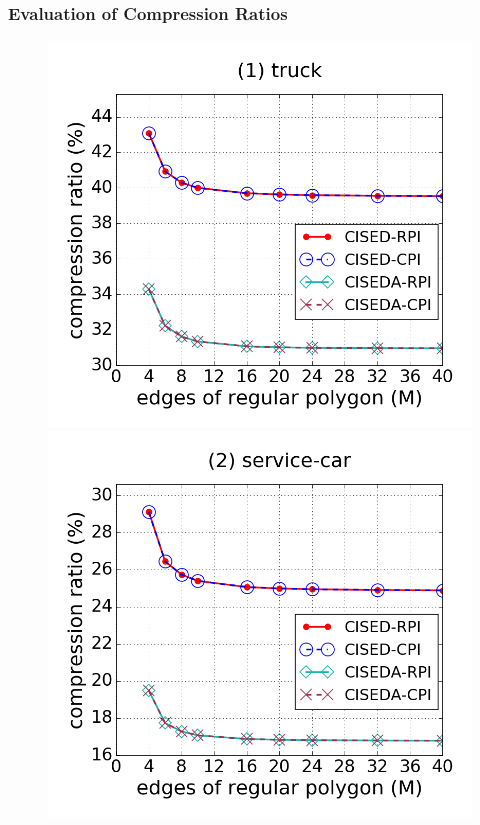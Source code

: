 \subsubsection{Evaluation of Compression Ratios}



\begin{figure}[tb!]
\centering
\includegraphics[scale = 0.245]{figures/Exp-M-e-20-CR-truck.png}
\includegraphics[scale = 0.245]{figures/Exp-M-e-20-CR-service.png}

\end{figure}
